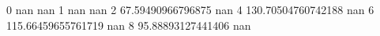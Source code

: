 0 nan nan
1 nan nan
2 67.59490966796875 nan
4 130.70504760742188 nan
6 115.66459655761719 nan
8 95.88893127441406 nan
